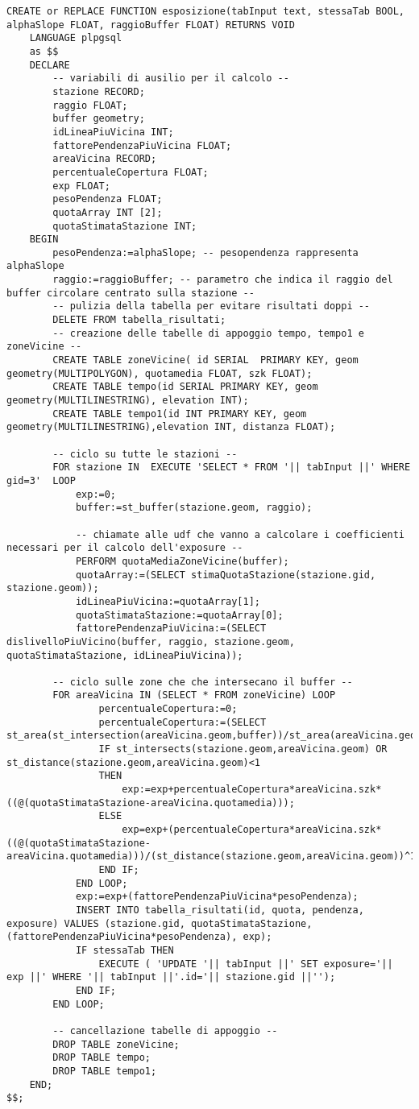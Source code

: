 \begin{lstlisting}[style=mySQL]
CREATE or REPLACE FUNCTION esposizione(tabInput text, stessaTab BOOL, alphaSlope FLOAT, raggioBuffer FLOAT) RETURNS VOID
	LANGUAGE plpgsql
	as $$
	DECLARE
		-- variabili di ausilio per il calcolo --
		stazione RECORD;
		raggio FLOAT;
		buffer geometry;
		idLineaPiuVicina INT;
		fattorePendenzaPiuVicina FLOAT;
		areaVicina RECORD;
		percentualeCopertura FLOAT;
		exp FLOAT;
		pesoPendenza FLOAT;
		quotaArray INT [2];
		quotaStimataStazione INT;
	BEGIN
		pesoPendenza:=alphaSlope; -- pesopendenza rappresenta alphaSlope
		raggio:=raggioBuffer; -- parametro che indica il raggio del buffer circolare centrato sulla stazione --
		-- pulizia della tabella per evitare risultati doppi --
		DELETE FROM tabella_risultati;
		-- creazione delle tabelle di appoggio tempo, tempo1 e zoneVicine --
		CREATE TABLE zoneVicine( id SERIAL  PRIMARY KEY, geom geometry(MULTIPOLYGON), quotamedia FLOAT, szk FLOAT);
		CREATE TABLE tempo(id SERIAL PRIMARY KEY, geom geometry(MULTILINESTRING), elevation INT);
		CREATE TABLE tempo1(id INT PRIMARY KEY, geom geometry(MULTILINESTRING),elevation INT, distanza FLOAT);

		-- ciclo su tutte le stazioni --
		FOR stazione IN  EXECUTE 'SELECT * FROM '|| tabInput ||' WHERE gid=3'  LOOP
			exp:=0;
			buffer:=st_buffer(stazione.geom, raggio);

			-- chiamate alle udf che vanno a calcolare i coefficienti necessari per il calcolo dell'exposure --
			PERFORM quotaMediaZoneVicine(buffer);
			quotaArray:=(SELECT stimaQuotaStazione(stazione.gid, stazione.geom));
			idLineaPiuVicina:=quotaArray[1];
			quotaStimataStazione:=quotaArray[0];
			fattorePendenzaPiuVicina:=(SELECT dislivelloPiuVicino(buffer, raggio, stazione.geom, quotaStimataStazione, idLineaPiuVicina));

		-- ciclo sulle zone che che intersecano il buffer --
		FOR areaVicina IN (SELECT * FROM zoneVicine) LOOP
				percentualeCopertura:=0;
				percentualeCopertura:=(SELECT st_area(st_intersection(areaVicina.geom,buffer))/st_area(areaVicina.geom));
				IF st_intersects(stazione.geom,areaVicina.geom) OR st_distance(stazione.geom,areaVicina.geom)<1
				THEN
					exp:=exp+percentualeCopertura*areaVicina.szk*((@(quotaStimataStazione-areaVicina.quotamedia)));
				ELSE
					exp=exp+(percentualeCopertura*areaVicina.szk*((@(quotaStimataStazione-areaVicina.quotamedia)))/(st_distance(stazione.geom,areaVicina.geom))^1);
				END IF;
			END LOOP;
			exp:=exp+(fattorePendenzaPiuVicina*pesoPendenza);
			INSERT INTO tabella_risultati(id, quota, pendenza, exposure) VALUES (stazione.gid, quotaStimataStazione, (fattorePendenzaPiuVicina*pesoPendenza), exp);
			IF stessaTab THEN
				EXECUTE ( 'UPDATE '|| tabInput ||' SET exposure='|| exp ||' WHERE '|| tabInput ||'.id='|| stazione.gid ||'');
			END IF;
		END LOOP;

		-- cancellazione tabelle di appoggio --
		DROP TABLE zoneVicine;
		DROP TABLE tempo;
		DROP TABLE tempo1;
	END;
$$;
\end{lstlisting}

